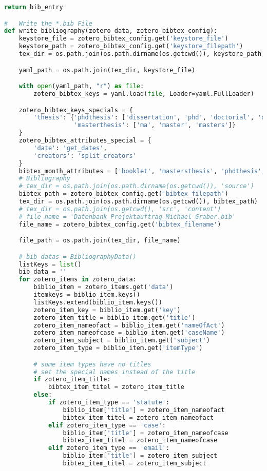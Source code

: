 \begin{lstlisting}[language=python, caption=Python LaTex - zotero.py - Zotero BibLaTex Importer,captionpos=b,label={lst:zotero},breaklines=true]
    return bib_entry

#   Write the *.bib File
def write_bibliography(zotero_data, zotero_bibtex_config):
    keystore_file = zotero_bibtex_config.get('keystore_file')
    keystore_path = zotero_bibtex_config.get('keystore_filepath')
    tex_dir = os.path.join(os.path.dirname(os.getcwd()), keystore_path)

    yaml_path = os.path.join(tex_dir, keystore_file)

    with open(yaml_path, "r") as file:
        zotero_bibtex_keys = yaml.load(file, Loader=yaml.FullLoader)

    zotero_bibtex_keys_specials = {
        'thesis': {'phdthesis': ['dissertation', 'phd', 'doctorial', 'doctor', 'doktor', 'doktorarbeit'],
                   'masterthesis': ['ma', 'master', 'masters']}
    }
    zotero_bibtex_attributes_special = {
        'date': 'get_dates',
        'creators': 'split_creators'
    }
    bibtex_month_attributes = ['booklet', 'mastersthesis', 'phdthesis', 'techreport']
    # Bibliography
    # tex_dir = os.path.join(os.path.dirname(os.getcwd()), 'source')
    bibtex_path = zotero_bibtex_config.get('bibtex_filepath')
    tex_dir = os.path.join(os.path.dirname(os.getcwd()), bibtex_path)
    # tex_dir = os.path.join(os.getcwd(), 'src', 'content')
    # file_name = 'Datenbank_Projektauftrag_Michael_Graber.bib'
    file_name = zotero_bibtex_config.get('bibtex_filename')

    file_path = os.path.join(tex_dir, file_name)

    # bib_datas = BibliographyData()
    listKeys = list()
    bib_data = ''
    for zotero_items in zotero_data:
        biblio_item = zotero_items.get('data')
        itemkeys = biblio_item.keys()
        listKeys.extend(biblio_item.keys())
        zotero_item_key = biblio_item.get('key')
        zotero_item_title = biblio_item.get('title')
        zotero_item_nameofact = biblio_item.get('nameOfAct')
        zotero_item_nameofcase = biblio_item.get('caseName')
        zotero_item_subject = biblio_item.get('subject')
        zotero_item_type = biblio_item.get('itemType')

        # some item types have no titles
        # set the special names instead of the title
        if zotero_item_title:
            bibtex_item_titel = zotero_item_title
        else:
            if zotero_item_type == 'statute':
                biblio_item['title'] = zotero_item_nameofact
                bibtex_item_titel = zotero_item_nameofact
            elif zotero_item_type == 'case':
                biblio_item['title'] = zotero_item_nameofcase
                bibtex_item_titel = zotero_item_nameofcase
            elif zotero_item_type == 'email':
                biblio_item['title'] = zotero_item_subject
                bibtex_item_titel = zotero_item_subject


\end{lstlisting}
